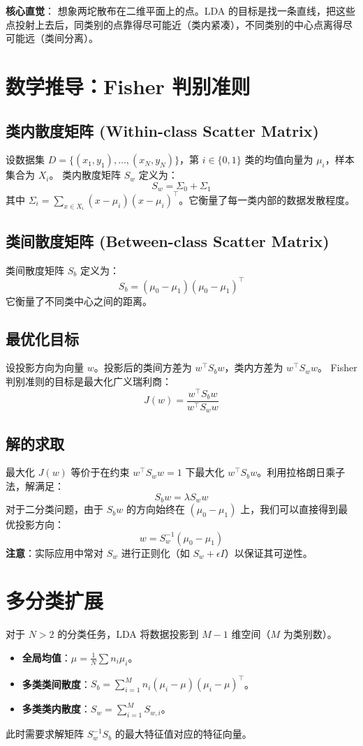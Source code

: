 \documentclass[12pt, a4paper]{book}
\begin{document}
\textbf{核心直觉}：
想象两坨散布在二维平面上的点。LDA 的目标是找一条直线，把这些点投射上去后，同类别的点靠得尽可能近（类内紧凑），不同类别的中心点离得尽可能远（类间分离）。

\section{数学推导：Fisher 判别准则}

\subsection{类内散度矩阵 (Within-class Scatter Matrix)}
设数据集 $D = \{(x_1, y_1), \dots, (x_N, y_N)\}$，第 $i \in \{0, 1\}$ 类的均值向量为 $\mu_i$，样本集合为 $X_i$。
类内散度矩阵 $S_w$ 定义为：
$$ S_w = \Sigma_0 + \Sigma_1 $$
其中 $\Sigma_i = \sum_{x \in X_i} (x - \mu_i)(x - \mu_i)^\top$。它衡量了每一类内部的数据发散程度。

\subsection{类间散度矩阵 (Between-class Scatter Matrix)}
类间散度矩阵 $S_b$ 定义为：
$$ S_b = (\mu_0 - \mu_1)(\mu_0 - \mu_1)^\top $$
它衡量了不同类中心之间的距离。

\subsection{最优化目标}
设投影方向为向量 $w$。投影后的类间方差为 $w^\top S_b w$，类内方差为 $w^\top S_w w$。
Fisher 判别准则的目标是最大化广义瑞利商：
$$ J(w) = \frac{w^\top S_b w}{w^\top S_w w} $$

\subsection{解的求取}
最大化 $J(w)$ 等价于在约束 $w^\top S_w w = 1$ 下最大化 $w^\top S_b w$。利用拉格朗日乘子法，解满足：
$$ S_b w = \lambda S_w w $$
对于二分类问题，由于 $S_b w$ 的方向始终在 $(\mu_0 - \mu_1)$ 上，我们可以直接得到最优投影方向：
$$ w = S_w^{-1} (\mu_0 - \mu_1) $$
\textbf{注意}：实际应用中常对 $S_w$ 进行正则化（如 $S_w + \epsilon I$）以保证其可逆性。

\section{多分类扩展}
对于 $N > 2$ 的分类任务，LDA 将数据投影到 $M-1$ 维空间（$M$ 为类别数）。
\begin{itemize}
    \item \textbf{全局均值}：$\mu = \frac{1}{N} \sum n_i \mu_i$。
    \item \textbf{多类类间散度}：$S_b = \sum_{i=1}^M n_i (\mu_i - \mu)(\mu_i - \mu)^\top$。
    \item \textbf{多类类内散度}：$S_w = \sum_{i=1}^M S_{w,i}$。
\end{itemize}
此时需要求解矩阵 $S_w^{-1} S_b$ 的最大特征值对应的特征向量。
\end{document}
